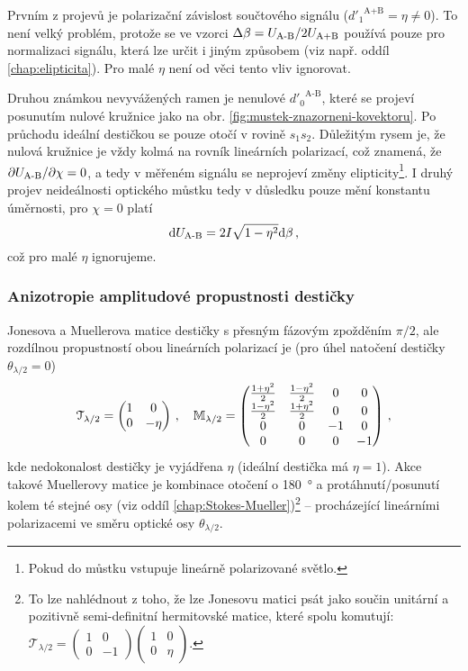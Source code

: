 Prvním z projevů je polarizační závislost součtového signálu (${d'_1}^\textrm{A+B}=\eta\neq0$).
To není velký problém, protože se ve vzorci $\Delta\beta=U_\textrm{A-B}/2U_\textrm{A+B}$ používá pouze pro normalizaci signálu, která lze určit i jiným způsobem (viz např. oddíl \ref{chap:elipticita}). 
Pro malé $\eta$ není od věci tento vliv ignorovat.

Druhou známkou nevyvážených ramen je nenulové  ${d'_0}^\textrm{A-B}$, které se projeví posunutím nulové kružnice jako na obr. \ref{fig:mustek-znazorneni-kovektoru}. 
Po průchodu ideální destičkou se pouze otočí v rovině $s_1s_2$.
Důležitým rysem je, že nulová kružnice je vždy kolmá na rovník lineárních polarizací, což znamená, že $\partial U_\textrm{A-B}/\partial\chi = 0$, a tedy v měřeném signálu se neprojeví změny elipticity\footnote{Pokud do můstku vstupuje lineárně polarizované světlo.}.
I druhý projev neideálnosti optického můstku tedy v důsledku pouze mění konstantu úměrnosti, pro $\chi=0$ platí
\begin{equation}
    \textrm{d}U_\textrm{A-B} = 2I \sqrt{1-\eta^2} \textrm{d}\beta \,,
\end{equation}
což pro malé $\eta$ ignorujeme.

\subsubsection*{Anizotropie amplitudové propustnosti destičky}
Jonesova a Muellerova matice destičky s přesným fázovým zpožděním $\pi/2$, ale rozdílnou propustností obou lineárních polarizací je (pro úhel natočení destičky $\theta_{\lambda/2}=0$)
\begin{equation}
    \mathcal{T}_{\lambda/2} = \begin{pmatrix} 1&0 \\ 0&-\eta \end{pmatrix} \,, \quad
    \mathbb{M}_{\lambda/2} = \begin{pmatrix} \frac{1+\eta^2}{2}&\frac{1-\eta^2}{2}&0&0 \\ \frac{1-\eta^2}{2}&\frac{1+\eta^2}{2}&0&0 \\ 0&0&-1&0 \\ 0&0&0&-1 \end{pmatrix} \,,
\end{equation}
kde nedokonalost destičky je vyjádřena $\eta$ (ideální destička má $\eta=1$).
Akce takové Muellerovy matice je kombinace otočení o \SI{180}{\degree} a protáhnutí/posunutí kolem té stejné osy (viz oddíl \ref{chap:Stokes-Mueller})\footnote{To lze nahlédnout z toho, že lze Jonesovu matici psát jako součin unitární a pozitivně semi-definitní hermitovské matice, které spolu komutují: $\mathcal{T}_{\lambda/2} = \begin{pmatrix} 1&0\\0&-1 \end{pmatrix} \begin{pmatrix} 1&0\\0&\eta \end{pmatrix}$.} -- procházející lineárními polarizacemi ve směru optické osy $\theta_{\lambda/2}$.

